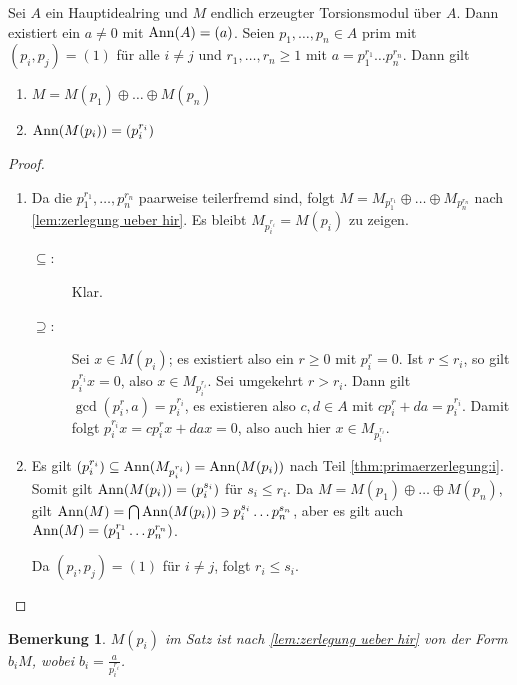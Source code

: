 \documentclass[12pt,a4paper]{scrartcl}
\theoremstyle{cplain}
\theoremstyle{cdef}
\newtheorem{beme}[thmcounter]{Bemerkung}
\begin{document}
\begin{satz} \label{thm:primaerzerlegung}
	Sei $A$ ein Hauptidealring und $M$ endlich erzeugter Torsionsmodul über $A$. Dann existiert ein $a\neq 0$ mit $\operatorname{Ann}(A) = (a)$. Seien $p_1,\dots, p_n\in A$ prim mit $(p_i, p_j) = (1)$ für alle $i\neq j$ und $r_1,\dots, r_n\geq 1$ mit $ a = p_1^{r_1}\dots p_n^{r_n} $. Dann gilt
	\begin{enumerate}
		\item $M = M(p_1)\oplus\dots\oplus M(p_n)$ \label{thm:primaerzerlegung:i}
		\item $\operatorname{Ann}(M(p_i)) = (p_i^{r_i})$ \label{thm:primaerzerlegung:ii}
	\end{enumerate}
\end{satz}
\begin{proof}
	\leavevmode
	\begin{enumerate}[label=\ref{thm:primaerzerlegung:\roman*}]
		\item Da die $p_1^{r_1},\dots, p_n^{r_n}$ paarweise teilerfremd sind, folgt $M = M_{p_1^{r_1}}\oplus\dots \oplus M_{p_n^{r_n}}$ nach \cref{lem:zerlegung ueber hir}. Es bleibt $M_{p_i^{r_i}} = M(p_i)$ zu zeigen.
		\begin{description}
			\item[\glqq$\subseteq$\grqq :] Klar.
			\item[\glqq$\supseteq$\grqq :] Sei $x\in M(p_i)$; es existiert also ein $r\geq 0$ mit $p_i^r = 0$. Ist $r \le r_i$, so gilt $p_i^{r_i}x = 0$, also $x \in M_{p_i^{r_i}}$. Sei umgekehrt $r>r_i$. Dann gilt $\gcd(p_i^r, a) = p_i^{r_i}$, es existieren also $c, d\in A$ mit $cp_i^r+da = p_i^{r_i}$. Damit folgt $p_i^{r_i}x = cp_i^rx+dax = 0$, also auch hier $x \in M_{p_i^{r_i}}$.
		\end{description}
		\item Es gilt $(p_i^{r_i})\subseteq \operatorname{Ann}(M_{p_i^{r_i}}) = \operatorname{Ann}(M(p_i))$ nach Teil \ref{thm:primaerzerlegung:i}. Somit gilt $\operatorname{Ann}(M(p_i)) = (p_i^{s_i})$ für $s_i\leq r_i$. Da $M = M(p_1)\oplus \dots \oplus M(p_n)$, gilt $\operatorname{Ann}(M) = \bigcap \operatorname{Ann}(M(p_i))\ni p_i^{s_i}\dots p_n^{s_n}$, aber es gilt auch $\operatorname{Ann}(M) = (p_1^{r_1}\dots p_n^{r_n})$.
		
		Da $(p_i, p_j) = (1)$ für $i\neq j$, folgt $r_i\leq s_i$.
		\qedhere
	\end{enumerate}
\end{proof}

\begin{beme}
	$M(p_i)$ im Satz ist nach \cref{lem:zerlegung ueber hir} von der Form $b_iM$, wobei $b_i = \frac{a}{p_i^{r_i}}$.
\end{beme}
\end{document}
